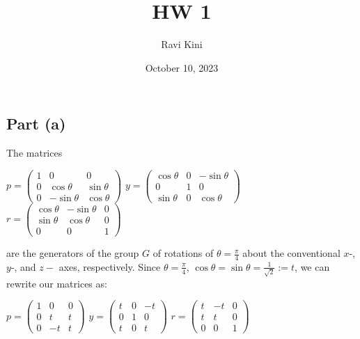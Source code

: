 \documentclass{article}
\title{HW 1}
\author{Ravi Kini}
\date{October 10, 2023}
\begin{document}
\maketitle

\problem
\subsection*{Part (a)}
The matrices
\begin{center}
    $p = 
    \begin{pmatrix} 
        1 & 0 & 0 \\
        0 & \cos\theta & \sin\theta  \\
        0 & -\sin\theta & \cos\theta
    \end{pmatrix}$
    \hspace{.25in}
    $y = 
    \begin{pmatrix} 
        \cos\theta & 0 & -\sin\theta \\
        0 & 1 &  0 \\
        \sin\theta & 0 & \cos\theta
    \end{pmatrix}$
    \hspace{.25in}
    $r = 
    \begin{pmatrix} 
        \cos\theta & -\sin\theta & 0 \\
        \sin\theta & \cos\theta  & 0 \\
        0 & 0 & 1
    \end{pmatrix}
    $
\end{center}
are the generators of the group $G$ of rotations of $\theta = \frac{\pi}{4}$ about the conventional $x$-, $y$-, and $z-$ axes, respectively. Since $\theta = \frac{\pi}{4}$, $\cos \theta = \sin \theta = \frac{1}{\sqrt{2}} := t$, we can rewrite our matrices as:
\begin{center}
    $p = 
    \begin{pmatrix} 
        1 & 0 & 0 \\
        0 & t & t  \\
        0 & -t & t
    \end{pmatrix}$
    \hspace{.25in}
    $y = 
    \begin{pmatrix} 
        t & 0 & -t \\
        0 & 1 &  0 \\
        t & 0 & t
    \end{pmatrix}$
    \hspace{.25in}
    $r = 
    \begin{pmatrix} 
        t & -t & 0 \\
        t  & t  & 0 \\
        0 & 0 & 1
    \end{pmatrix}
    $
\end{center}
\end{document}
